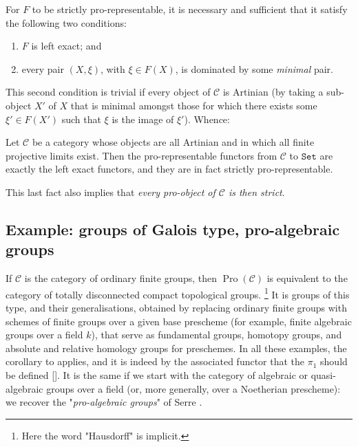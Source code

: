 \begin{proposition}\label{fga3.ii-a.3-proposition-3.1}
    For $F$ to be strictly pro-representable, it is necessary and sufficient that it satisfy the following two conditions:
    \begin{enumerate}[i]
        \item $F$ is left exact; and
        \item every pair $(X,\xi)$, with $\xi\in F(X)$, is dominated by some \emph{minimal} pair.
    \end{enumerate}
\end{proposition}


This second condition is trivial if every object of $\mathcal{C}$ is Artinian (by taking a sub-object $X'$ of $X$ that is minimal amongst those for which there exists some $\xi'\in F(X')$ such that $\xi$ is the image of $\xi'$).
Whence:

\begin{corollary}\label{fga3.ii-a.3-proposition-3.1-corollary}
    Let $\mathcal{C}$ be a category whose objects are all Artinian and in which all finite projective limits exist.
    Then the pro-representable functors from $\mathcal{C}$ to $\mathtt{Set}$ are exactly the left exact functors, and they are in fact strictly pro-representable.
\end{corollary}

This last fact also implies that \emph{every pro-object of $\mathcal{C}$ is then strict}.


\subsection{Example: groups of Galois type, pro-algebraic groups}\label{fga3.ii-a.4}

If $\mathcal{C}$ is the category of ordinary finite groups, then $\operatorname{Pro}(\mathcal{C})$ is equivalent to the category of totally disconnected compact topological groups.
\footnote{Here the word "Hausdorff" is implicit.}
It is groups of this type, and their generalisations, obtained by replacing ordinary finite groups with schemes of finite groups over a given base prescheme (for example, finite algebraic groups over a field $k$), that serve as fundamental groups, homotopy groups, and absolute and relative homology groups for preschemes.
In all these examples, the corollary to  applies, and it is indeed by the associated functor that the $\pi_1$ should be defined [].
It is the same if we start with the category of algebraic or quasi-algebraic groups over a field (or, more generally, over a Noetherian prescheme): we recover the "\emph{pro-algebraic groups}" of Serre \cite{Ser1958}.

